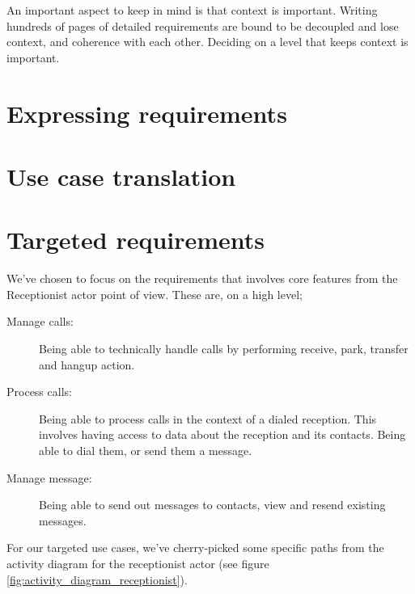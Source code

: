 An important aspect to keep in mind is that context is important. Writing hundreds of pages of detailed requirements are bound to be decoupled and lose context, and coherence with each other. Deciding on a level that keeps context is important.

\section{Expressing requirements}

\section{Use case translation}


\section{Targeted requirements}
We've chosen to focus on the requirements that involves core features from the Receptionist actor point of view. These are, on a high level;
\begin{description}
  \item[Manage calls:] Being able to technically handle calls by performing receive, park, transfer and hangup action.
  \item[Process calls:] Being able to process calls in the context of a dialed reception. This involves having access to data about the reception and its contacts. Being able to dial them, or send them a message.
  \item[Manage message:] Being able to send out messages to contacts, view and resend existing messages.
\end{description}

For our targeted use cases, we've cherry-picked some specific paths from the activity diagram for the receptionist actor (see figure \ref{fig:activity_diagram_receptionist}).

